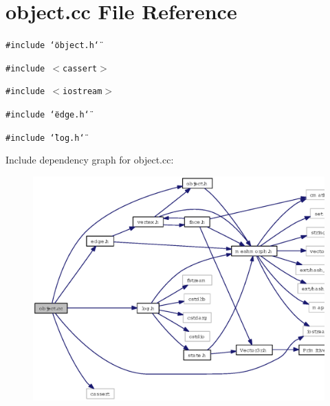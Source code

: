 \section{object.cc File Reference}
\label{object_8cc}
{\tt \#include \char`\"{}object.h\char`\"{}}\par
{\tt \#include $<$cassert$>$}\par
{\tt \#include $<$iostream$>$}\par
{\tt \#include \char`\"{}edge.h\char`\"{}}\par
{\tt \#include \char`\"{}log.h\char`\"{}}\par


Include dependency graph for object.cc:\begin{figure}[H]
\begin{center}
\leavevmode
\includegraphics[width=361pt]{object_8cc__incl}
\end{center}
\end{figure}

